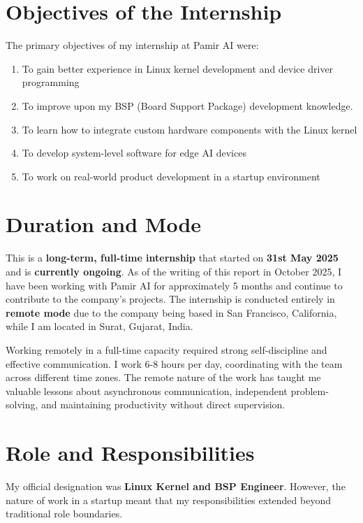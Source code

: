\documentclass[12pt,a4paper]{report}
\begin{document}
\section{Objectives of the Internship}

The primary objectives of my internship at Pamir AI were:

\begin{enumerate}[itemsep=0.3cm]
    \item To gain better experience in Linux kernel development and device driver programming
    \item To improve upon my BSP (Board Support Package) development knowledge.
    \item To learn how to integrate custom hardware components with the Linux kernel
    \item To develop system-level software for edge AI devices
    \item To work on real-world product development in a startup environment
\end{enumerate}

\section{Duration and Mode}

This is a \textbf{long-term, full-time internship} that started on \textbf{31st May 2025} and is \textbf{currently ongoing}. As of the writing of this report in October 2025, I have been working with Pamir AI for approximately 5 months and continue to contribute to the company's projects. The internship is conducted entirely in \textbf{remote mode} due to the company being based in San Francisco, California, while I am located in Surat, Gujarat, India.

\vspace{0.3cm}

Working remotely in a full-time capacity required strong self-discipline and effective communication. I work 6-8 hours per day, coordinating with the team across different time zones. The remote nature of the work has taught me valuable lessons about asynchronous communication, independent problem-solving, and maintaining productivity without direct supervision.

\section{Role and Responsibilities}

My official designation was \textbf{Linux Kernel and BSP Engineer}. However, the nature of work in a startup meant that my responsibilities extended beyond traditional role boundaries.
\end{document}
